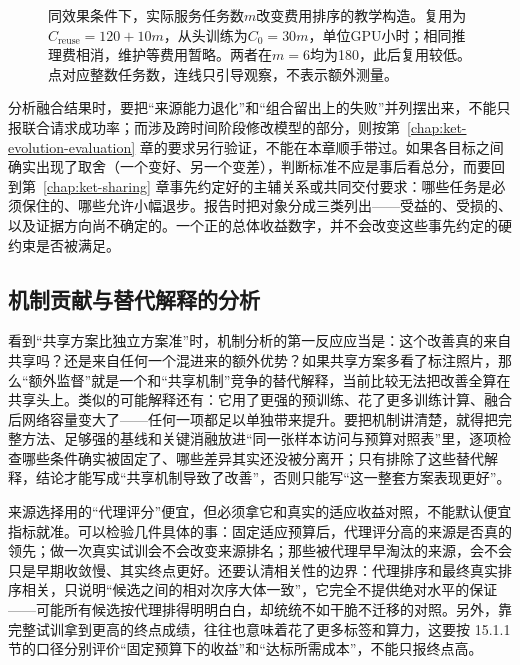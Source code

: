\begin{figure}[htbp]
  \centering
  
  \caption{同效果条件下，实际服务任务数$m$改变费用排序的教学构造。复用为$C_{\mathrm{reuse}}=120+10m$，从头训练为$C_0=30m$，单位GPU小时；相同推理费相消，维护等费用暂略。两者在$m=6$均为180，此后复用较低。点对应整数任务数，连线只引导观察，不表示额外测量。}
  \label{fig:ket-evaluation-utility}
\end{figure}

分析融合结果时，要把“来源能力退化”和“组合留出上的失败”并列摆出来，不能只报联合请求成功率；而涉及跨时间阶段修改模型的部分，则按第~\ref{chap:ket-evolution-evaluation} 章的要求另行验证，不能在本章顺手带过。如果各目标之间确实出现了取舍（一个变好、另一个变差），判断标准不应是事后看总分，而要回到第~\ref{chap:ket-sharing} 章事先约定好的主辅关系或共同交付要求：哪些任务是必须保住的、哪些允许小幅退步。报告时把对象分成三类列出——受益的、受损的、以及证据方向尚不确定的。一个正的总体收益数字，并不会改变这些事先约定的硬约束是否被满足。

\subsection{机制贡献与替代解释的分析}
\label{sec:ket-evaluation-mechanisms}

看到“共享方案比独立方案准”时，机制分析的第一反应应当是：这个改善真的来自共享吗？还是来自任何一个混进来的额外优势？如果共享方案多看了标注照片，那么“额外监督”就是一个和“共享机制”竞争的替代解释，当前比较无法把改善全算在共享头上。类似的可能解释还有：它用了更强的预训练、花了更多训练计算、融合后网络容量变大了——任何一项都足以单独带来提升。要把机制讲清楚，就得把完整方法、足够强的基线和关键消融放进“同一张样本访问与预算对照表”里，逐项检查哪些条件确实被固定了、哪些差异其实还没被分离开；只有排除了这些替代解释，结论才能写成“共享机制导致了改善”，否则只能写“这一整套方案表现更好”。

来源选择用的“代理评分”便宜，但必须拿它和真实的适应收益对照，不能默认便宜指标就准。可以检验几件具体的事：固定适应预算后，代理评分高的来源是否真的领先；做一次真实试训会不会改变来源排名；那些被代理早早淘汰的来源，会不会只是早期收敛慢、其实终点更好。还要认清相关性的边界：代理排序和最终真实排序相关，只说明“候选之间的相对次序大体一致”，它完全不提供绝对水平的保证——可能所有候选按代理排得明明白白，却统统不如干脆不迁移的对照。另外，靠完整试训拿到更高的终点成绩，往往也意味着花了更多标签和算力，这要按 15.1.1 节的口径分别评价“固定预算下的收益”和“达标所需成本”，不能只报终点高。

